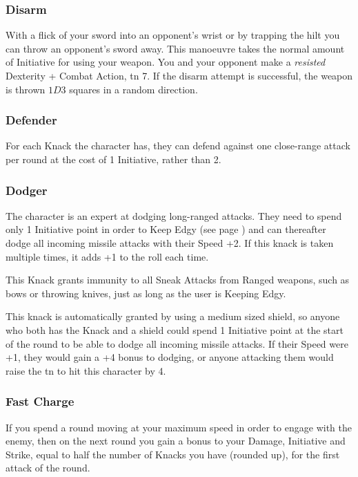 \begin{multicols}{2}
\subsubsection{Disarm}

With a flick of your sword into an opponent's wrist or by trapping the hilt you can throw an opponent's sword away. This manoeuvre takes the normal amount of Initiative for using your weapon. You and your opponent make a \textit{resisted} Dexterity + Combat Action, \gls{tn} 7. If the disarm attempt is successful, the weapon is thrown $1D3$ squares in a random direction.

\subsubsection{Defender}

For each Knack the character has, they can defend against one close-range attack per round at the cost of 1 Initiative, rather than 2.

\subsubsection{Dodger}
\label{dodger}

The character is an expert at dodging long-ranged attacks.
They need to spend only 1 Initiative point in order to Keep Edgy (see page \pageref{edgy}) and can thereafter dodge all incoming missile attacks with their Speed +2.
If this knack is taken multiple times, it adds +1 to the roll each time.

This Knack grants immunity to all Sneak Attacks from Ranged weapons, such as bows or throwing knives, just as long as the user is Keeping Edgy.

This knack is automatically granted by using a medium sized shield, so anyone who both has the Knack and a shield could spend 1 Initiative point at the start of the \gls{round} to be able to dodge all incoming missile attacks. If their Speed were +1, they would gain a +4 bonus to dodging, or anyone attacking them would raise the \gls{tn} to hit this character by 4.

\subsubsection{Fast Charge}

If you spend a \gls{round} moving at your maximum speed in order to engage with the enemy, then on the next round you gain a bonus to your Damage, Initiative and Strike, equal to half the number of Knacks you have (rounded up), for the first attack of the round.


\end{multicols}

